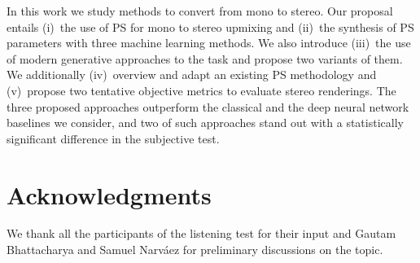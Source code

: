 \documentclass{article}
\def\final{}
\begin{document}
In this work we study methods to convert from mono to stereo. 
Our proposal entails (i)~the use of PS for mono to stereo upmixing and (ii)~the synthesis of PS parameters with three machine learning methods. We also introduce (iii)~the use of modern generative approaches to the task and propose two variants of them. 
We additionally (iv)~overview and adapt an existing PS methodology and (v)~propose two tentative objective metrics to evaluate stereo renderings. The three proposed approaches outperform the classical and the deep neural network baselines we consider, and two of such approaches stand out with a statistically significant difference in the subjective test. 

\ifdefined\final
\section{Acknowledgments}

We thank all the participants of the listening test for their input and Gautam Bhattacharya and Samuel Narv\'aez for preliminary discussions on the topic. 
\fi


\end{document}
